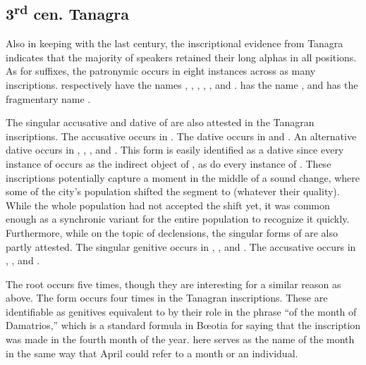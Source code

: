 \subsection{3\textsuperscript{rd} cen.  Tanagra}
Also in keeping with the last century,
the inscriptional evidence from Tanagra indicates that the majority of speakers retained their long alphas in all positions.
As for suffixes,
the patronymic  occurs in eight instances across as many inscriptions.
 respectively have the names ,
,
,
,
,
and .
 has the name ,
and  has the fragmentary name .

The singular accusative and dative of  are also attested in the Tanagran inscriptions.
The accusative  occurs in .
The dative  occurs in  and .
An alternative dative  occurs in , , , and .
This form is easily identified as a dative since every instance of  occurs as the indirect object of ,
as do every instance of .
These inscriptions potentially capture a moment in the middle of a sound change,
where some of the city's population shifted the segment   to  (whatever their quality).
While the whole population had not accepted the shift yet,
it was common enough as a synchronic variant for the entire population to recognize it quickly.
Furthermore,
while on the topic of declensions,
the singular forms of  are also partly attested.
The singular genitive  occurs in ,
,
and . 
The accusative  occurs in ,
,
and . 

The root  occurs five times,
though they are interesting for a similar reason as  above.
The form  occurs four times in the Tanagran inscriptions.
These are identifiable as genitives equivalent to  by their role
in the phrase  ``of the month of Damatrios,''
which is a standard formula in Bœotia for saying that the inscription was made in the fourth month of the year. \autocite[162]{McLean}
 here serves as the name of the month in the same way that April could refer to a month or an individual.


